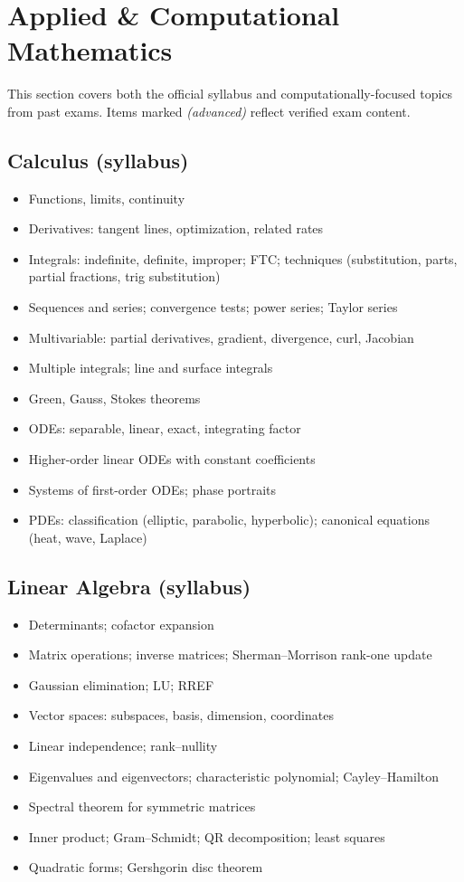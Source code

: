 \section{Applied \& Computational Mathematics}
\label{sec:prep-applied}

This section covers both the official syllabus and computationally-focused topics from past exams. Items marked \textit{(advanced)} reflect verified exam content.

\subsection{Calculus (syllabus)}

\begin{itemize}
  \item Functions, limits, continuity
  \item Derivatives: tangent lines, optimization, related rates
  \item Integrals: indefinite, definite, improper; FTC; techniques (substitution, parts, partial fractions, trig substitution)
  \item Sequences and series; convergence tests; power series; Taylor series
  \item Multivariable: partial derivatives, gradient, divergence, curl, Jacobian
  \item Multiple integrals; line and surface integrals
  \item Green, Gauss, Stokes theorems
  \item ODEs: separable, linear, exact, integrating factor
  \item Higher-order linear ODEs with constant coefficients
  \item Systems of first-order ODEs; phase portraits
  \item PDEs: classification (elliptic, parabolic, hyperbolic); canonical equations (heat, wave, Laplace)
\end{itemize}

\subsection{Linear Algebra (syllabus)}

\begin{itemize}
  \item Determinants; cofactor expansion
  \item Matrix operations; inverse matrices; Sherman--Morrison rank-one update
  \item Gaussian elimination; LU; RREF
  \item Vector spaces: subspaces, basis, dimension, coordinates
  \item Linear independence; rank--nullity
  \item Eigenvalues and eigenvectors; characteristic polynomial; Cayley--Hamilton
  \item Spectral theorem for symmetric matrices
  \item Inner product; Gram--Schmidt; QR decomposition; least squares
  \item Quadratic forms; Gershgorin disc theorem
\end{itemize}

